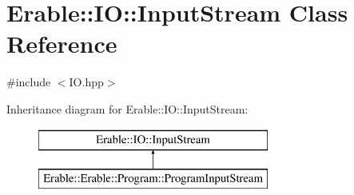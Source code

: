 \hypertarget{class_erable_1_1_i_o_1_1_input_stream}{}\section{Erable\+::IO\+::Input\+Stream Class Reference}
\label{class_erable_1_1_i_o_1_1_input_stream}


{\ttfamily \#include $<$I\+O.\+hpp$>$}

Inheritance diagram for Erable\+::IO\+::Input\+Stream\+:\begin{figure}[H]
\begin{center}
\leavevmode
\includegraphics[height=2.000000cm]{class_erable_1_1_i_o_1_1_input_stream}
\end{center}
\end{figure}
